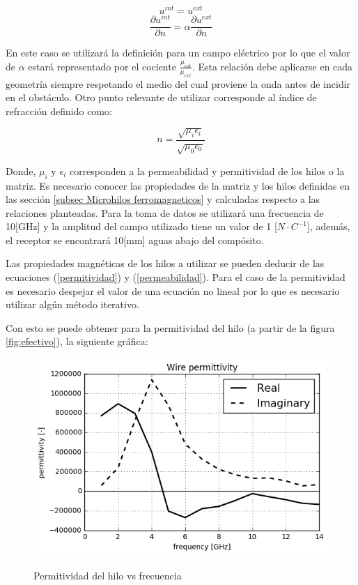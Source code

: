\documentclass[12pt,letterpaper]{article}
\numberwithin{equation}{section}
\begin{document}
$$u^{int} = u^{ext}$$
$$\frac{\partial u^{int}}{\partial n} =\alpha \frac{\partial u^{ext}}{\partial n}$$
	
En este caso se utilizará la definición para un campo eléctrico por lo que el valor de $\alpha$ estará representado por el cociente $\frac{\mu_{int}}{\mu_{ext}}$. Esta relación debe aplicarse en cada geometría siempre respetando el medio del cual proviene la onda antes de incidir en el obstáculo. Otro punto relevante de utilizar corresponde al índice de refracción definido como:

$$n = \frac{\sqrt{\mu_i\epsilon_i}}{\sqrt{\mu_0\epsilon_0}}$$

Donde, $\mu_i$ y $\epsilon_i$ corresponden a la permeabilidad y permitividad de los hilos o la matriz. Es necesario conocer las propiedades de la matriz y los hilos definidas en las sección \ref{subsec Microhilos ferromagneticos} y calculadas respecto a las relaciones planteadas. Para la toma de datos se utilizará una frecuencia de 10[GHz] y la amplitud del campo utilizado tiene un valor de 1 [$N\cdot C^{-1}$], además, el receptor se encontrará 10[mm] aguas abajo del compósito.

Las propiedades magnéticas de los hilos a utilizar se pueden deducir de las ecuaciones (\ref{permitividad}) y (\ref{permeabilidad}). Para el caso de la permitividad es necesario despejar el valor de una ecuación no lineal por lo que es necesario utilizar algún método iterativo.

Con esto se puede obtener para la permitividad del hilo (a partir de la figura \ref{fig:efectivo}), la siguiente gráfica:

\begin{figure}[H]
	\centering\includegraphics[scale=0.8]{Imagenes/wire_permittivity.png}\\
	\caption{Permitividad del hilo vs frecuencia}
	\label{fig:wire_permittivity}
\end{figure} 
\end{document}
